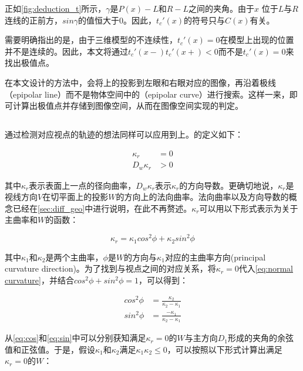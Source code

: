 正如\autoref{fig:deduction_t}所示，$\gamma$是$P(x)-L$和$R-L$之间的夹角。由于$x$ 位于$L$与$R$连线的正前方，$sin\gamma$的值恒大于0。因此，$t_c'(x)$的符号只与$C(x)$有关。

需要明确指出的是，由于三维模型的不连续性，$t_c'(x)=0$在模型上出现的位置并不是连续的。因此，本文将通过$t_c'(x-)t_c'(x+) < 0$而不是$t_c'(x)=0$来找出极值点。

在本文设计的方法中，会将\ec{}上的\conp{}投影到左眼和右眼对应的图像，再沿着极线（epipolar line）而不是物体空间中的\ec{}（epipolar curve）进行搜索。这样一来，即可计算出极值点并存储到图像空间，从而在图像空间实现\epsl{}的判定。

\subsection{\scon{}}
\label{sec:suggestive_contour_math}
通过检测对应视点的轨迹的想法同样可以应用到\scon{}上。\scon{}的定义如下：

\begin{align}
  \kappa_r &= 0 \label{eq:Kr} \\
  D_w\kappa_r &> 0 \label{eq:DwKr} 
\end{align}

其中$\kappa_r$表示表面上一点的径向曲率，$D_w\kappa_r$表示$\kappa_r$的方向导数。更确切地说，$\kappa_r$是视线方向$V$在切平面上的投影$W$的方向上的法向曲率。法向曲率以及方向导数的概念已经在\autoref{sec:diff_geo}中进行说明，在此不再赘述。$\kappa_r$可以用以下形式表示为关于主曲率和$W$的函数：

\begin{equation}\label{eq:normal curvature}
    \kappa_r = \kappa_1cos^2\phi+\kappa_2sin^2\phi
\end{equation}

其中$\kappa_1$和$\kappa_2$是两个主曲率，$\phi$是$W$的方向与$\kappa_1$对应的主曲率方向(principal curvature direction)。为了找到\scon{}与视点之间的对应关系，将$\kappa_r = 0$代入\autoref{eq:normal curvature}，并结合$cos^2\phi + sin^2\phi = 1$，可以得到：

\begin{align}
    cos^2\phi &= \frac{\kappa_2}{\kappa_2-\kappa_1} \label{eq:cos}\\
    sin^2\phi &= \frac{-\kappa_1}{\kappa_2-\kappa_1} \label{eq:sin}
\end{align}

从\autoref{eq:cos}和\autoref{eq:sin}中可以分别获知满足$\kappa_r = 0$的$W$与主方向$D_1$形成的夹角的余弦值和正弦值。于是，假设$\kappa_1$和$\kappa_2$满足$\kappa_1\kappa_2 \leq 0$，可以按照以下形式计算出满足$\kappa_r = 0$的$W$：

